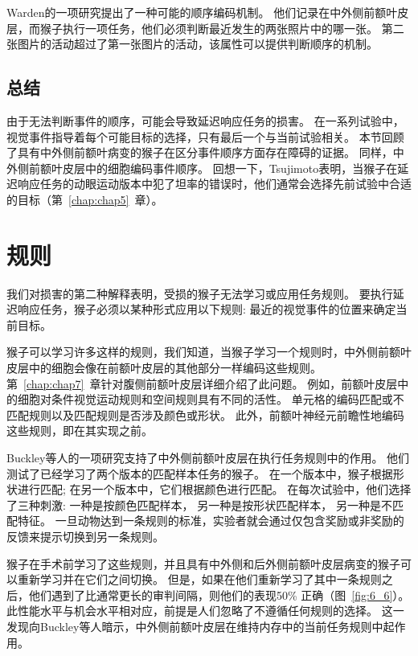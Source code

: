 Warden\cite{warden2007representation}的一项研究提出了一种可能的顺序编码机制。
他们记录在中外侧前额叶皮层，而猴子执行一项任务，他们必须判断最近发生的两张照片中的哪一张。
第二张图片的活动超过了第一张图片的活动，该属性可以提供判断顺序的机制。



\subsection{总结}

由于无法判断事件的顺序，可能会导致延迟响应任务的损害。
在一系列试验中，视觉事件指导着每个可能目标的选择，只有最后一个与当前试验相关。
本节回顾了具有中外侧前额叶病变的猴子在区分事件顺序方面存在障碍的证据。
同样，中外侧前额叶皮层中的细胞编码事件顺序。
回想一下，Tsujimoto\cite{tsujimoto2012prefrontal}表明，当猴子在延迟响应任务的动眼运动版本中犯了坦率的错误时，他们通常会选择先前试验中合适的目标（第~\ref{chap:chap5}~章）。



\section{规则}

我们对损害的第二种解释表明，受损的猴子无法学习或应用任务规则。
要执行延迟响应任务，猴子必须以某种形式应用以下规则: 最近的视觉事件的位置来确定当前目标。


猴子可以学习许多这样的规则，我们知道，当猴子学习一个规则时，中外侧前额叶皮层中的细胞会像在前额叶皮层的其他部分一样编码这些规则。
第~\ref{chap:chap7}~章针对腹侧前额叶皮层详细介绍了此问题。
例如，前额叶皮层中的细胞对条件视觉运动规则和空间规则\cite{wise1999role}具有不同的活性。
单元格的编码匹配或不匹配规则\cite{wallis2001single}以及匹配规则是否涉及颜色或形状\cite{mansouri2006prefrontal}。
此外，前额叶神经元前瞻性地编码这些规则，即在其实现之前\cite{wallis2001single}。


Buckley等人\cite{buckley2009dissociable}的一项研究支持了中外侧前额叶皮层在执行任务规则中的作用。
他们测试了已经学习了两个版本的匹配样本任务的猴子。
在一个版本中，猴子根据形状进行匹配; 
在另一个版本中，它们根据颜色进行匹配。
在每次试验中，他们选择了三种刺激: 
一种是按颜色匹配样本，
另一种是按形状匹配样本，
另一种是不匹配特征。
一旦动物达到一条规则的标准，实验者就会通过仅包含奖励或非奖励的反馈来提示切换到另一条规则。


猴子在手术前学习了这些规则，并且具有中外侧和后外侧前额叶皮层病变的猴子可以重新学习并在它们之间切换。
但是，如果在他们重新学习了其中一条规则之后，他们遇到了比通常更长的审判间隔，则他们的表现50\% 正确\cite{buckley2009dissociable}（图~\ref{fig:6_6}）。
此性能水平与机会水平相对应，前提是人们忽略了不遵循任何规则的选择。
这一发现向Buckley等人暗示，中外侧前额叶皮层在维持内存中的当前任务规则中起作用。


